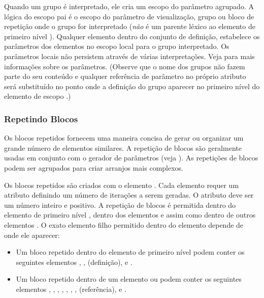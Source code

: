 \documentclass[letterpaper,10pt,brazil]{sphinxmanual}
\begin{document}
Quando um grupo é interpretado, ele cria um escopo do parâmetro
agrupado.
A lógica do escopo pai é o escopo do parâmetro de visualização, grupo ou
bloco de repetição onde o grupo for interpretado (\emph{não} é um parente
léxico ao elemento de primeiro nível ).
Qualquer elemento  dentro do conjunto de definição, estabelece
os parâmetros dos elementos no escopo local para o grupo interpretado.
Os parâmetros locais não persistem através de várias interpretações.
Veja {\hyperref[techspecs/layout_files:layout\string-concepts\string-params]{}} para mais informações sobre os
parâmetros. (Observe que o nome dos grupos não fazem parte do seu
conteúdo e qualquer referência de parâmetro no próprio atributo 
será substituído no ponto onde a definição do grupo aparecer no primeiro
nível do elemento de escopo .)


\subsubsection{Repetindo Blocos}
\label{techspecs/layout_files:repetindo-blocos}\label{techspecs/layout_files:layout-parts-repeats}
Os blocos repetidos fornecem uma maneira concisa de gerar ou organizar
um grande número de elementos similares. A repetição de blocos são
geralmente usadas em conjunto com o gerador de parâmetros
(veja {\hyperref[techspecs/layout_files:layout\string-concepts\string-params]{}}).
As repetições de blocos podem ser agrupados para criar arranjos mais
complexos.

Os blocos repetidos são criados com o elemento .
Cada elemento  requer um atributo  definindo um
número de iterações a serem geradas.
O atributo  deve ser um número inteiro e positivo. A repetição
de blocos é permitida dentro do elemento de primeiro nível
, dentro dos elementos  e  assim como
dentro de outros elementos . O exato elemento filho permitido
dentro do elemento  depende de onde ele aparecer:
\begin{itemize}
\item {} 
Um bloco repetido dentro do elemento de primeiro nível 
podem conter os seguintes elementos
, ,  (definição), e .

\item {} 
Um bloco repetido dentro de um elemento  ou  podem
conter os seguintes elementos
, , , , , ,
,  (referência), e .

\end{itemize}
\end{document}
